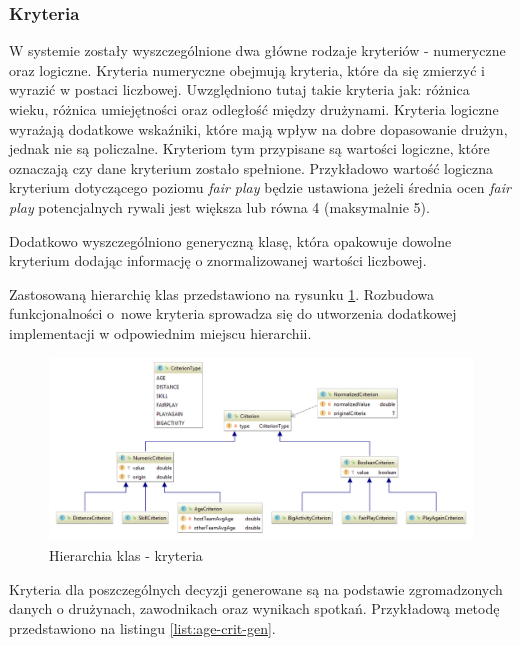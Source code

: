 \subsubsection{Kryteria}

W systemie zostały wyszczególnione dwa główne rodzaje kryteriów - numeryczne oraz logiczne. Kryteria numeryczne obejmują kryteria, które da się zmierzyć i wyrazić w postaci liczbowej. Uwzględniono tutaj takie kryteria jak: różnica wieku, różnica umiejętności oraz odległość między drużynami. Kryteria logiczne wyrażają dodatkowe wskaźniki, które mają wpływ na dobre dopasowanie drużyn, jednak nie są policzalne.  Kryteriom tym przypisane są wartości logiczne, które oznaczają czy dane kryterium zostało spełnione. Przykładowo wartość logiczna kryterium dotyczącego poziomu \textit{fair play} będzie ustawiona jeżeli średnia ocen \textit{fair play} potencjalnych rywali jest większa lub równa 4 (maksymalnie 5).

Dodatkowo wyszczególniono generyczną klasę, która opakowuje dowolne kryterium dodając informację o znormalizowanej wartości liczbowej. 

Zastosowaną hierarchię klas przedstawiono na rysunku \ref{fig:criterion-classes}. Rozbudowa funkcjonalności o~nowe kryteria sprowadza się do utworzenia dodatkowej implementacji w odpowiednim miejscu hierarchii.  

\begin{figure}[H]
\centering
\includegraphics[width=\linewidth]{06-implementacja/rys/criterion-package-classes.PNG}
\caption{Hierarchia klas - kryteria}
\label{fig:criterion-classes}
\end{figure}

Kryteria dla poszczególnych decyzji generowane są na podstawie zgromadzonych danych o drużynach, zawodnikach oraz wynikach spotkań. Przykładową metodę przedstawiono na listingu \ref{list:age-crit-gen}. 


